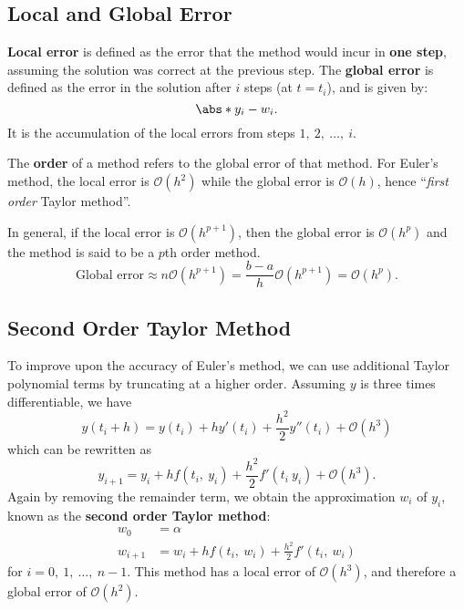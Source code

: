 \documentclass{article}
\begin{document}
\subsection{Local and Global Error}
\textbf{Local error} is defined as the error that the method would incur in \textbf{one step},
assuming the solution was correct at the previous step.
The \textbf{global error} is defined as the error in the solution after \(i\) steps (at \(t = t_i\)),
and is given by:
\begin{equation*}
    \abs*{y_i - w_i}.
\end{equation*}
It is the accumulation of the local errors from steps \(1,\: 2,\: \ldots,\: i\).

The \textbf{order} of a method refers to the global error of that method. For Euler's
method, the local error is \(\mathcal{O}\left( h^2 \right)\) while the global error is
\(\mathcal{O}\left( h \right)\), hence ``\textit{first order} Taylor method''.

In general, if the local error is \(\mathcal{O}\left( h^{p + 1} \right)\), then the global error is
\(\mathcal{O}\left( h^p \right)\) and the method is said to be a \(p\)th order method.
\begin{equation*}
    \text{Global error} \approx n \mathcal{O}\left( h^{p + 1} \right) = \frac{b - a}{h} \mathcal{O}\left( h^{p + 1} \right) = \mathcal{O}\left( h^p \right).
\end{equation*}
\subsection{Second Order Taylor Method}
To improve upon the accuracy of Euler's method, we can use additional Taylor polynomial terms by truncating at a higher order.
Assuming \(y\) is three times differentiable, we have
\begin{equation*}
    y\left( t_i + h \right) = y\left( t_i \right) + h y'\left( t_i \right) + \frac{h^2}{2} y''\left( t_i \right) + \mathcal{O}\left( h^3 \right)
\end{equation*}
which can be rewritten as
\begin{equation*}
    y_{i + 1} = y_i + h f\left( t_i,\: y_i \right) + \frac{h^2}{2} f'\left( t_i\: y_i \right) + \mathcal{O}\left( h^3 \right).
\end{equation*}
Again by removing the remainder term, we obtain the approximation \(w_i\) of \(y_i\), known as the \textbf{second order Taylor method}:
\begin{align*}
    w_0       & = \alpha                                                                         \\
    w_{i + 1} & = w_i + h f\left( t_i,\: w_i \right) + \frac{h^2}{2} f'\left( t_i,\: w_i \right)
\end{align*}
for \(i = 0,\: 1,\: \ldots,\: n - 1\).
This method has a local error of \(\mathcal{O}\left( h^3 \right)\), and therefore a global error of \(\mathcal{O}\left( h^2 \right)\).
\end{document}
